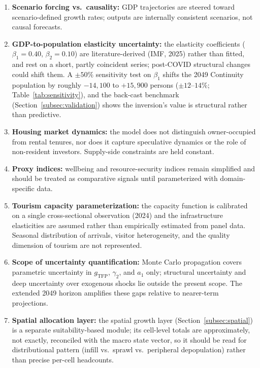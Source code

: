\documentclass[urbansci,article,submit,pdftex,moreauthors]{Definitions/mdpi}
\begin{document}
\begin{enumerate}
\item \textbf{Scenario forcing vs.\ causality:} GDP trajectories are steered
      toward scenario-defined growth rates; outputs are internally consistent
      scenarios, not causal forecasts.
\item \textbf{GDP-to-population elasticity uncertainty:} the elasticity
      coefficients ($\beta_1=0.40$, $\beta_2=0.10$) are literature-derived
      (IMF, 2025) rather than fitted, and rest on a short, partly coincident
      series; post-COVID structural changes could shift them. A $\pm50\%$
      sensitivity test on $\beta_1$ shifts the 2049 Continuity population by
      roughly $-14{,}100$ to $+15{,}900$ persons ($\pm12$--$14\%$;
      Table~\ref{tab:sensitivity}), and the back-cast benchmark
      (Section~\ref{subsec:validation}) shows the inversion's value is structural
      rather than predictive.
\item \textbf{Housing market dynamics:} the model does not distinguish
      owner-occupied from rental tenures, nor does it capture speculative
      dynamics or the role of non-resident investors. Supply-side constraints
      are held constant.
\item \textbf{Proxy indices:} wellbeing and resource-security indices remain
      simplified and should be treated as comparative signals until
      parameterized with domain-specific data.
\item \textbf{Tourism capacity parameterization:} the capacity function is
      calibrated on a single cross-sectional observation (2024) and the
      infrastructure elasticities are assumed rather than empirically estimated
      from panel data. Seasonal distribution of arrivals, visitor heterogeneity,
      and the quality dimension of tourism are not represented.
\item \textbf{Scope of uncertainty quantification:} Monte Carlo propagation
      covers parametric uncertainty in $g_\text{TFP}$, $\gamma_2$, and $a_1$
      only; structural uncertainty and deep uncertainty over exogenous shocks
      lie outside the present scope. The extended 2049 horizon amplifies these
      gaps relative to nearer-term projections.
\item \textbf{Spatial allocation layer:} the spatial growth layer
      (Section~\ref{subsec:spatial}) is a separate suitability-based module; its
      cell-level totals are approximately, not exactly, reconciled with the macro
      state vector, so it should be read for distributional pattern (infill vs.\
      sprawl vs.\ peripheral depopulation) rather than precise per-cell headcounts.
\end{enumerate}
\end{document}

